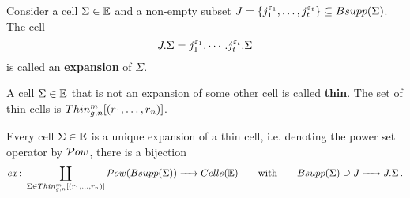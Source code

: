 \begin{defi}
    \label{cellular_models:dual_ehrenfried:expansion_of_Sigma}
    Consider a cell $\Sigma \in \mathbb E$ and a non-empty subset $J = \{ j_1^{\eps_1}, \ldots, j_t^{\eps_t} \} \subseteq Bsupp(\Sigma)$.
    The cell
    \[
        J.\Sigma = j_1^{\varepsilon_1}. \cdots. j_t^{\varepsilon_t}.\Sigma
    \]
    is called an {\bf expansion} of $\Sigma$.
\end{defi}

\begin{defi}
    \label{cellular_models:dual_ehrenfried:thin_cells}
    A cell $\Sigma \in \mathbb E$ that is not an expansion of some other cell is called \textbf{thin}.
    The set of thin cells is $\Thin$.
\end{defi}

\begin{prop}
    \label{cellular_models:dual_ehrenfried:every_cell_is_an_expansion}
    Every cell $\Sigma \in \mathbb E$ is a unique expansion of a thin cell, i.e.
    denoting the power set operator by $\mathcal{P}ow$, there is a bijection
    \[
        ex \colon \coprod_{\Sigma \in \Thin} \mc Pow( Bsupp(\Sigma)) \to Cells(\E) \mspc{with}{20} Bsupp(\Sigma) \supseteq J \mapsto J.\Sigma \,.
    \]
\end{prop}

